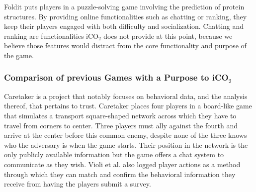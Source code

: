 \documentclass[preprint,authoryear,12pt]{elsarticle}
\makeatletter
\renewcommand{\paragraph}{\@startsection{paragraph}{4}{\z@}%
  {-3.25ex\@plus -1ex \@minus -.2ex}%
  {1.5ex \@plus .2ex}%
  {\normalfont\normalsize\mdseries}}
\makeatother
\begin{document}


Foldit \citep{cooper2010predicting} puts players in a puzzle-solving game involving the prediction of protein structures. By providing online functionalities such as chatting or ranking, they keep their players engaged with both difficulty and socialization. Chatting and ranking are functionalities iCO$_2$ does not provide at this point, because we believe those features would distract from the core functionality and purpose of the game.




\subsubsection{Comparison of previous Games with a Purpose to iCO$_2$}

Caretaker \citep{Violi:2011} is a project that notably focuses on behavioral data, and the analysis thereof, that pertains to trust. Caretaker places four players in a board-like game that simulates a transport square-shaped network across which they have to travel from corners to center. Three players must ally against the fourth and arrive at the center before this common enemy, despite none of the three knows who the adversary is when the game starts. Their position in the network is the only publicly available information but the game offers a chat system to communicate as they wish. Violi et al. also logged player actions as a method through which they can match and confirm the behavioral information they receive from having the players submit a survey.
\end{document}

